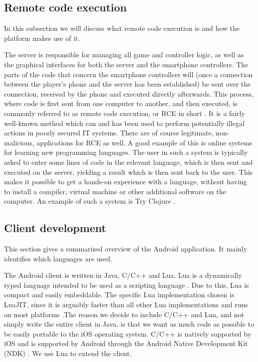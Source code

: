 \documentclass{article}
\begin{document}
\subsection{Remote code execution}
In this subsection we will discuss what remote code execution is and how the platform makes use
of it. 

The server is responsible for managing all game and controller logic, as well as the graphical
interfaces for both the server and the smartphone controllers. The parts of the code that concern
the smartphone controllers will (once a connection between the player's phone and the server has
been established) be sent over the connection, received by the phone and executed directly
afterwards.
This process, where code is first sent from one computer to another, and then executed, is
commonly referred to as remote code execution, or RCE in short \cite{key:3}. It is a fairly well-known
method which can and has been used to perform potentially illegal actions in poorly secured IT
systems. There are of course legitimate, non-malicious, applications for RCE as well. A good
example of this is online systems for learning new programming languages. The user in such a
system is typically asked to enter some lines of code in the relevant language, which is then sent
and executed on the server, yielding a result which is then sent back to the user. This makes it
possible to get a hands-on experience with a language, without having to install a compiler,
virtual machine or other additional software on the computer. An example of such a system is
Try Clojure \cite{key:4}.

\subsection{Client development}
This section gives a summarized overview of the Android application. It mainly identifies which languages are used. 

The Android client is written in Java, C/C++ and Lua. Lua is a dynamically typed language intended to be used as a scripting language \cite{key:5}. Due to this, Lua is compact 
and easily embeddable. The specific Lua implementation chosen is LuaJIT, since it is arguably faster than all other Lua implementations \cite{key:6} and runs on most
 platforms \cite{key:7}.The reason we decide to include C/C++ and Lua, and not simply write the entire client in Java, is that we want as much code as possible to be 
easily portable to the iOS operating system. C/C++ is natively supported by iOS and is supported by Android through the Android Native Development Kit (NDK) \cite{key:8}. We use Lua to extend the client.
\end{document}

